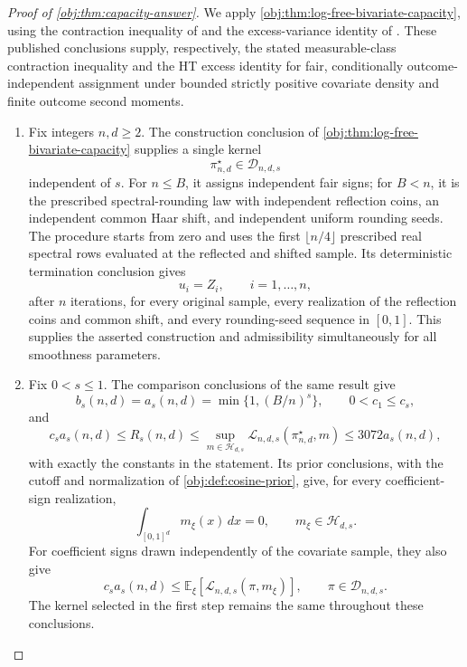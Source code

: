 \begin{proof}[Proof of \cref{obj:thm:capacity-answer}]
We apply \cref{obj:thm:log-free-bivariate-capacity}, using the contraction inequality of \citep[Theorem 12(4), with the complexity convention of Definition 2]{BartlettMendelson2002Complexities} and the excess-variance identity of \citep[Proposition 2.3, equation (2.4), under Assumption 2.1 and Definition 2.2]{Cytrynbaum2026Limits}. These published conclusions supply, respectively, the stated measurable-class contraction inequality and the HT excess identity for fair, conditionally outcome-independent assignment under bounded strictly positive covariate density and finite outcome second moments.

\begin{enumerate}
\item Fix integers \(n,d\geq2\). The construction conclusion of \cref{obj:thm:log-free-bivariate-capacity} supplies a single kernel
\[
\pi^\star_{n,d}\in\mathcal D_{n,d,s}
\]
independent of \(s\). For \(n\leq B\), it assigns independent fair signs; for \(B<n\), it is the prescribed spectral-rounding law with independent reflection coins, an independent common Haar shift, and independent uniform rounding seeds. The procedure starts from zero and uses the first \(\lfloor n/4\rfloor\) prescribed real spectral rows evaluated at the reflected and shifted sample. Its deterministic termination conclusion gives
\[
u_i=Z_i,\qquad i=1,\ldots,n,
\]
after \(n\) iterations, for every original sample, every realization of the reflection coins and common shift, and every rounding-seed sequence in \([0,1]\). This supplies the asserted construction and admissibility simultaneously for all smoothness parameters.

\item Fix \(0<s\leq1\). The comparison conclusions of the same result give
\[
b_s(n,d)=a_s(n,d)=\min\{1,(B/n)^s\},
\qquad
0<c_1\leq c_s,
\]
and
\[
c_sa_s(n,d)
\leq R_s(n,d)
\leq
\sup_{m\in\mathcal H_{d,s}}
\mathcal L_{n,d,s}(\pi^\star_{n,d},m)
\leq3072a_s(n,d),
\]
with exactly the constants in the statement. Its prior conclusions, with the cutoff and normalization of \cref{obj:def:cosine-prior}, give, for every coefficient-sign realization,
\[
\int_{[0,1]^d}m_\xi(x)\,dx=0,
\qquad
m_\xi\in\mathcal H_{d,s}.
\]
For coefficient signs drawn independently of the covariate sample, they also give
\[
c_sa_s(n,d)
\leq
\mathbb E_\xi\!\left[\mathcal L_{n,d,s}(\pi,m_\xi)\right],
\qquad
\pi\in\mathcal D_{n,d,s}.
\]
The kernel selected in the first step remains the same throughout these conclusions.


\end{enumerate}
\end{proof}
